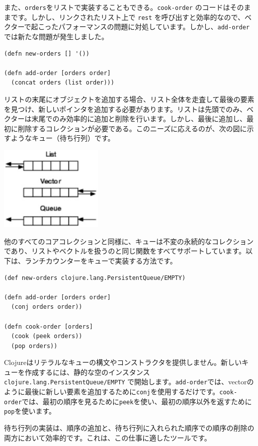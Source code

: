 また、\texttt{orders}をリストで実装することもできる。\texttt{cook-order} のコードはそのままです。しかし、リンクされたリスト上で \texttt{rest} を呼び出すと効率的なので、ベクターで起こったパフォーマンスの問題に対処しています。しかし、\texttt{add-order}では新たな問題が発生しました。

\begin{lstlisting}[numbers=none]
(defn new-orders [] '())

(defn add-order [orders order]
  (concat orders (list order)))
\end{lstlisting}

リストの末尾にオブジェクトを追加する場合、リスト全体を走査して最後の要素を見つけ、新しいポインタを追加する必要があります。リストは先頭でのみ、ベクターは末尾でのみ効率的に追加と削除を行います。しかし、最後に追加し、最初に削除するコレクションが必要である。このニーズに応えるのが、次の図に示すようなキュー（待ち行列）です。

\includegraphics[width=5cm]{fig_02_001.eps}


他のすべてのコアコレクションと同様に、キューは不変の永続的なコレクションであり、リストやベクトルを扱うのと同じ関数をすべてサポートしています。以下は、ランチカウンターをキューで実装する方法です。

\begin{lstlisting}[numbers=none]
(def new-orders clojure.lang.PersistentQueue/EMPTY)

(defn add-order [orders order]
  (conj orders order))

(defn cook-order [orders]
  (cook (peek orders))
  (pop orders))
\end{lstlisting}

Clojureはリテラルなキューの構文やコンストラクタを提供しません。新しいキューを作成するには、静的な空のインスタンス \texttt{clojure.lang.PersistentQueue/EMPTY} で開始します。\texttt{add-order}では、vectorのように最後に新しい要素を追加するために\texttt{conj}を使用するだけです。\texttt{cook-order}では、最初の順序を見るために\texttt{peek}を使い、最初の順序以外を返すために\texttt{pop}を使います。

待ち行列の実装は、順序の追加と、待ち行列に入れられた順序での順序の削除の両方において効率的です。これは、この仕事に適したツールです。

